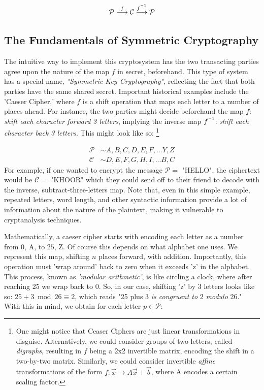 \documentclass[11pt, a4paper]{report}
\newcommand{\inv}{^{\raisebox{.2em}{$\scriptscriptstyle-1$}}}
\begin{document}
$$ \mathcal{P} \overset{f}\longrightarrow \mathcal{C} \overset{f\inv}\longrightarrow \mathcal{P} $$

\subsection{The Fundamentals of Symmetric Cryptography}

The intuitive way to implement this cryptosystem has the two transacting parties agree upon the nature of the map $f$ in secret, beforehand. This type of system has a special name, \textit{"Symmetric Key Cryptography"}, reflecting the fact that both parties have the same shared secret. Important historical examples include the 'Caeser Cipher,' where $f$ is a shift operation that maps each letter to a number of places ahead. For instance, the two parties might decide beforehand the map $f$: \textit{shift each character forward 3 letters}, implying the inverse map $f\inv$: \textit{shift each character back 3 letters}. This might look like so: \footnote[0]{One might notice that Ceaser Ciphers are just linear transformations in disguise. Alternatively, we could consider groups of two letters, called \textit{digraphs}, resulting in $f$ being a 2x2 invertible matrix, encoding the shift in a two-by-two matrix. Similarly, we could consider invertible \textit{affine} transformations of the form $f:\vec{x} \to A\vec{x} + \vec{b}$, where A encodes a certain scaling factor.}

\begin{align*}
 \mathcal{P} &\sim A,B,C,D,E,F,...Y,Z  \\ 
 \mathcal{C} &\sim D,E,F,G,H,I,...B,C 
\end{align*} %
For example, if one wanted to encrypt the message $\mathcal{P} =$ "HELLO", the ciphertext would be $\mathcal{C} =$ "KHOOR" which they could send off to their friend to decode with the inverse, subtract-three-letters map. Note that, even in this simple example, repeated letters, word length, and other syntactic information provide a lot of information about the nature of the plaintext, making it vulnerable to cryptanalysis techniques.\autocite[56]{koblitz} 

Mathematically, a caeser cipher starts with encoding each letter as a number from $0$, A, to $25$, Z. Of course this depends on what alphabet one uses. We represent this map, shifting $n$ places forward, with addition. Importantly, this operation must 'wrap around' back to zero when it exceeds 'z' in the alphabet. This process, known as \textit{'modular arithmetic'}, is like circling a clock, where after reaching 25 we wrap back to 0. So, in our case, shifting 'z' by 3 letters looks like so: $25 + 3 \bmod 26 \equiv 2$, which reads "25 plus 3 \textit{is congruent to} 2 \textit{modulo} 26." With this in mind, we obtain for each letter $p \in \mathcal{P}$:  
\end{document}
